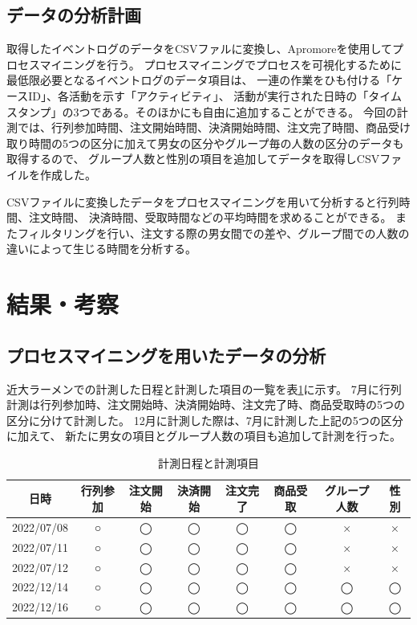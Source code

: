\documentclass{jsarticle}
\begin{document}
\subsection{データの分析計画}
取得したイベントログのデータをCSVファルに変換し、Apromoreを使用してプロセスマイニングを行う。
プロセスマイニングでプロセスを可視化するために最低限必要となるイベントログのデータ項目は、
一連の作業をひも付ける「ケースID」、各活動を示す「アクティビティ」、
活動が実行された日時の「タイムスタンプ」の3つである。そのほかにも自由に追加することができる。
今回の計測では、行列参加時間、注文開始時間、決済開始時間、注文完了時間、商品受け取り時間の5つの区分に加えて男女の区分やグループ毎の人数の区分のデータも取得するので、
グループ人数と性別の項目を追加してデータを取得しCSVファイルを作成した。

CSVファイルに変換したデータをプロセスマイニングを用いて分析すると行列時間、注文時間、
決済時間、受取時間などの平均時間を求めることができる。
またフィルタリングを行い、注文する際の男女間での差や、グループ間での人数の違いによって生じる時間を分析する。




\newpage

\section{結果・考察}

\subsection{プロセスマイニングを用いたデータの分析}
近大ラーメンでの計測した日程と計測した項目の一覧を表\ref{table5}に示す。
7月に行列計測は行列参加時、注文開始時、決済開始時、注文完了時、商品受取時の5つの区分に分けて計測した。
12月に計測した際は、7月に計測した上記の5つの区分に加えて、
新たに男女の項目とグループ人数の項目も追加して計測を行った。

\begin{table}[H]
 \begin{center}
   \caption{計測日程と計測項目}
   \begin{tabular}{|c|c|c|c|c|c|c|c|} \hline
日時 & 行列参加 & 注文開始 & 決済開始 & 注文完了 & 商品受取 & グループ人数 & 性別 \\ \hline \hline
2022/07/08 & ○ & ◯ & ◯ & ◯ & ◯ & × & × \\ \hline
2022/07/11 & ○ & ◯ & ◯ & ◯ & ◯ & × & × \\ \hline
2022/07/12 & ○ & ◯ & ◯ & ◯ & ◯ & × & × \\ \hline
2022/12/14 & ○ & ◯ & ◯ & ◯ & ◯ & ◯ & ◯ \\ \hline
2022/12/16 & ○ & ◯ & ◯ & ◯ & ◯ & ◯ & ◯ \\ \hline
  \end{tabular}
 \label{table5}
 \end{center}
\end{table}
\end{document}

